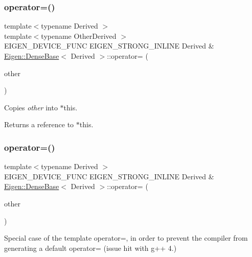 \subsubsection{\texorpdfstring{operator=()}{operator=()}\hspace{0.1cm}{\footnotesize\ttfamily [1/3]}}
{\footnotesize\ttfamily template$<$typename Derived $>$ \\
template$<$typename Other\+Derived $>$ \\
E\+I\+G\+E\+N\+\_\+\+D\+E\+V\+I\+C\+E\+\_\+\+F\+U\+NC E\+I\+G\+E\+N\+\_\+\+S\+T\+R\+O\+N\+G\+\_\+\+I\+N\+L\+I\+NE Derived \& \mbox{\hyperlink{class_eigen_1_1_dense_base}{Eigen\+::\+Dense\+Base}}$<$ Derived $>$\+::operator= (\begin{DoxyParamCaption}\item[{const \mbox{\hyperlink{class_eigen_1_1_dense_base}{Dense\+Base}}$<$ Other\+Derived $>$ \&}]{other }\end{DoxyParamCaption})}

Copies {\itshape other} into $\ast$this. \begin{DoxyReturn}{Returns}
a reference to $\ast$this. 
\end{DoxyReturn}
\mbox{\label{class_eigen_1_1_dense_base_aae79d5d0d95e60bf2e64d0dc3dfd66a4}} 
\subsubsection{\texorpdfstring{operator=()}{operator=()}\hspace{0.1cm}{\footnotesize\ttfamily [2/3]}}
{\footnotesize\ttfamily template$<$typename Derived $>$ \\
E\+I\+G\+E\+N\+\_\+\+D\+E\+V\+I\+C\+E\+\_\+\+F\+U\+NC E\+I\+G\+E\+N\+\_\+\+S\+T\+R\+O\+N\+G\+\_\+\+I\+N\+L\+I\+NE Derived \& \mbox{\hyperlink{class_eigen_1_1_dense_base}{Eigen\+::\+Dense\+Base}}$<$ Derived $>$\+::operator= (\begin{DoxyParamCaption}\item[{const \mbox{\hyperlink{class_eigen_1_1_dense_base}{Dense\+Base}}$<$ Derived $>$ \&}]{other }\end{DoxyParamCaption})}

Special case of the template operator=, in order to prevent the compiler from generating a default operator= (issue hit with g++ 4.) \mbox{\label{class_eigen_1_1_dense_base_a6462697d5a6fa3104f5f1213fdf9ff12}} 
